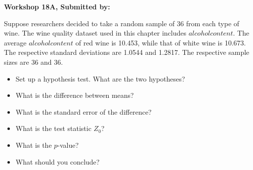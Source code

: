 \documentclass[11pt, chapterprefix=true]{scrbook}\usepackage[]{graphicx}\usepackage[]{color}
\begin{document}
\begin{exercises}
\begin{exercise}
\end{exercise}
\begin{solution}  %

\end{solution}




\clearpage

    \begin{exercise}  %
    


    \begin{center}
\begin{flushleft}\textbf{\large \hfill Workshop 18A, Submitted by: }\end{flushleft}

\end{center}

Suppose researchers decided to take a random sample of 36 from each type of wine.  The wine quality dataset used in this chapter includes $alcohol content$. The average $alcohol content$ of red wine is 10.453, while that of white wine is 10.673. The respective standard deviations are 1.0544 and 1.2817. The respective sample sizes are 36 and 36.

\begin{itemize}
  \item Set up a hypothesis test. What are the two hypotheses?
  \item What is the difference between means?
  \item What is the standard error of the difference?
  \item What is the test statistic $Z_0$?
  \item What is the $p$-value?
  \item What should you conclude?
\end{itemize}


\end{exercise}
\end{exercises}
\end{document}
